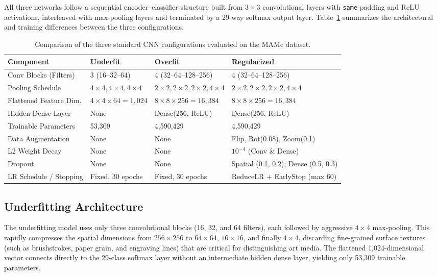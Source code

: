 \documentclass[11pt, a4paper]{article}
\begin{document}
All three networks follow a sequential encoder--classifier structure built from $3 \times 3$ convolutional layers with \texttt{same} padding and ReLU activations, interleaved with max-pooling layers and terminated by a 29-way softmax output layer. Table~\ref{tab:architectures} summarizes the architectural and training differences between the three configurations.

\begin{table}[htbp]
\centering
\caption{Comparison of the three standard CNN configurations evaluated on the MAMe dataset.}
\label{tab:architectures}
\small
\begin{tabular}{@{}llll@{}}
\toprule
\textbf{Component} & \textbf{Underfit} & \textbf{Overfit} & \textbf{Regularized} \\
\midrule
Conv Blocks (Filters) & 3 (16--32--64) & 4 (32--64--128--256) & 4 (32--64--128--256) \\
Pooling Schedule & $4\times 4, 4\times 4, 4\times 4$ & $2\times 2, 2\times 2, 2\times 2, 4\times 4$ & $2\times 2, 2\times 2, 2\times 2, 4\times 4$ \\
Flattened Feature Dim. & $4\times 4\times 64 = 1{,}024$ & $8\times 8\times 256 = 16{,}384$ & $8\times 8\times 256 = 16{,}384$ \\
Hidden Dense Layer & None & Dense(256, ReLU) & Dense(256, ReLU) \\
Trainable Parameters & 53,309 & 4,590,429 & 4,590,429 \\
Data Augmentation & None & None & Flip, Rot(0.08), Zoom(0.1) \\
L2 Weight Decay & None & None & $10^{-4}$ (Conv \& Dense) \\
Dropout & None & None & Spatial (0.1, 0.2); Dense (0.5, 0.3) \\
LR Schedule / Stopping & Fixed, 30 epochs & Fixed, 30 epochs & ReduceLR + EarlyStop (max 60) \\
\bottomrule
\end{tabular}
\end{table}

\subsection{Underfitting Architecture}
The underfitting model uses only three convolutional blocks (16, 32, and 64 filters), each followed by aggressive $4 \times 4$ max-pooling. This rapidly compresses the spatial dimensions from $256 \times 256$ to $64 \times 64$, $16 \times 16$, and finally $4 \times 4$, discarding fine-grained surface textures (such as brushstrokes, paper grain, and engraving lines) that are critical for distinguishing art media. The flattened 1,024-dimensional vector connects directly to the 29-class softmax layer without an intermediate hidden dense layer, yielding only 53,309 trainable parameters.
\end{document}
